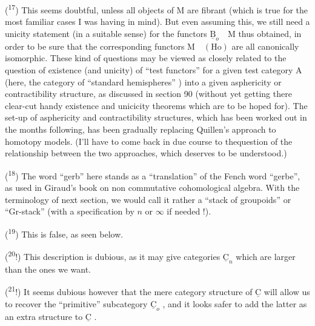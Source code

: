 (\textsuperscript{17}) This seems doubtful, unless all objects of $\mathrm{M}$ are fibrant (which is true for the most familiar cases I was having in mind). But even assuming this, we still need a unicity statement (in a suitable sense) for the functors $\underline{\mathrm{B}}_{o}\quad \mathrm{M}$ thus obtained, in order to be sure that the corresponding functors $\mathrm{M}\quad(\mathrm{Ho})$ are all canonically isomorphic. These kind of questions may be viewed as closely related to the question of existence (and unicity) of ``test functors'' for a given test category $\mathrm{A}$ (here, the category of ``standard hemispheres'' ) into a given asphericity or contractibility structure, as discussed in section 90 (without yet getting there  clear-cut handy existence and unicicity theorems which are to be  hoped for). The set-up of asphericity and contractibility structures, which has been worked out in the months following, has been gradually replacing Quillen's approach to homotopy models. (I'll have to come back in due course to thequestion of the relationship between the two approaches, which deserves to be understood.)

(\textsuperscript{18}) The word ``gerb'' here stands  as a ``translation'' of the Fench word ``gerbe'', as used in Giraud's book on non commutative cohomological algebra. With the terminology of next section, we would call it rather a ``stack of groupoids'' or ``Gr-stack'' (with a specification by $n$ or $\infty$ if needed !).

(\textsuperscript{19}\deleted{\unsure{)}}\unsure{!}) This is false, as seen below.

(\textsuperscript{20}\deleted{)}!) This description is dubious, as it may give categories $\underline{\mathrm{C}}_{n}$ which are larger than the ones we want.

(\textsuperscript{21}!) It seems dubious however that the mere category structure of $\underline{\mathrm{C}}$ will allow us to recover the  ``primitive'' subcategory $\underline{\mathrm{C}}_{o}$ , and it looks safer to add the latter as an extra structure to $\underline{\mathrm{C}}$ .
\noindent{}

